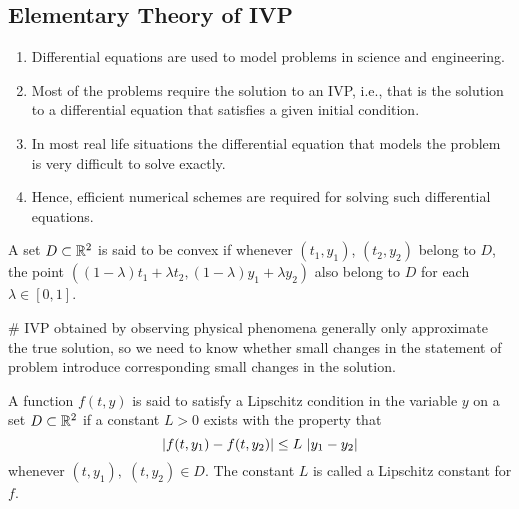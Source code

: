 \documentclass[../main-sheet.tex]{subfiles}
\begin{document}
\subsection{Elementary Theory of IVP}
\begin{enumerate}
    \item Differential equations are used to model problems in science and engineering.
    \item Most of the problems require the solution to an IVP, i.e., that is the solution to a differential equation that satisfies a given initial condition.
    \item In most real life situations the differential equation that models the problem is very difficult to solve exactly.
    \item Hence, efficient numerical schemes are required for solving such differential equations.
\end{enumerate}
\begin{defn}
    A set \(D\subset\mathbb{R}^2\) is said to be convex if whenever \((t_1,y_1)\), \((t_2,y_2)\) belong to \(D\), the point \(((1-\lambda)t_1+\lambda t_2,(1-\lambda)y_1+\lambda y_2)\) also belong to \(D\) for each \(\lambda \in [0,1]\).
    \begin{center}
    \end{center}
\end{defn}
\# IVP obtained by observing physical phenomena generally only approximate the true solution, so we need to know whether small changes in the statement of problem introduce corresponding small changes in the solution.
\begin{defn}
    A function \(f(t,y)\) is said to satisfy a Lipschitz condition in the variable \(y\) on a set \(D\subset \mathbb{R}^2\) if a constant \(L>0\) exists with the property that
    \[
        \left\vert f(t,y_1)-f(t,y_2)\right\vert\leq L\,\left\vert y_1-y_2\right\vert
    \]
    whenever \((t,y_1),\;(t,y_2)\in D\).
    The constant \(L\) is called a Lipschitz constant for \(f\).
\end{defn}
\end{document}
